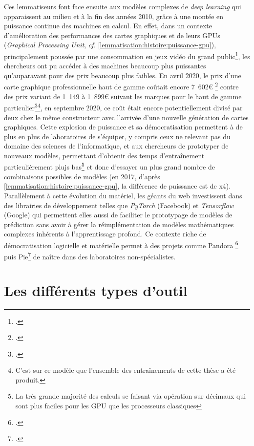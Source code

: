 Ces lemmatiseurs font face ensuite aux modèles complexes de \textit{deep learning} qui apparaissent au milieu et à la fin des années 2010, grâce à une montée en puissance continue des machines en calcul. En effet, dans un contexte d'amélioration des performances des cartes graphiques et de leurs GPUs (\textit{Graphical Processing Unit}, \textit{cf.} \ref{lemmatisation:histoire:puissance-gpu}), principalement poussée par une consommation en jeux vidéo du grand public\footcite{tanz_how_2017}, les chercheurs ont pu accéder à des machines beaucoup plus puissantes qu'auparavant pour des prix beaucoup plus faibles. En avril 2020, le prix d'une carte graphique professionnelle haut de gamme coûtait encore 7~602€ \footcite{noauthor_pny_2020} contre des prix variant de 1~149 à 1~899€ suivant les marques pour le haut de gamme particulier\footcite{noauthor_recherche_2020}\footnote{C'est sur ce modèle que l'ensemble des entraînements de cette thèse a été produit.}, en septembre 2020, ce coût était encore potentiellement divisé par deux chez le même constructeur avec l'arrivée d'une nouvelle génération de cartes graphiques. Cette explosion de puissance et sa démocratisation permettent à de plus en plus de laboratoires de s'équiper, y compris ceux ne relevant pas du domaine des sciences de l'informatique, et aux chercheurs de prototyper de nouveaux modèles, permettant d'obtenir des temps d'entraînement particulièrement plujs bas\footnote{La très grande majorité des calculs se faisant via opération sur décimaux qui sont plus faciles pour les GPU que les processeurs classiques} et donc d'essayer un plus grand nombre de combinaisons possibles de modèles (en 2017, d'après \ref{lemmatisation:histoire:puissance-gpu}, la différence de puissance est de x4). Parallèlement à cette évolution du matériel, les géants du web investissent dans des librairies de développement telles que \textit{PyTorch} (Facebook) et \textit{Tensorflow} (Google) qui permettent elles aussi de faciliter le prototypage de modèles de prédiction sans avoir à gérer la réimplémentation de modèles mathématiques complexes inhérents à l'apprentissage profond. Ce contexte riche de démocratisation logicielle et matérielle permet à des projets comme Pandora \footcites{kestemont_lemmatization_2017}{de_gussem_integrated_2017} puis Pie\footcite{manjavacas_improving_2019} de naître dans des laboratoires non-spécialistes. 

\section{Les différents types d'outil}

